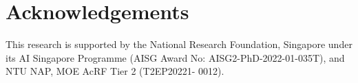 \section{Acknowledgements}

This research is supported by the National Research Foundation, Singapore under its AI Singapore Programme (AISG Award No: AISG2-PhD-2022-01-035T), and NTU NAP, MOE AcRF Tier 2 (T2EP20221- 0012).

\newpage